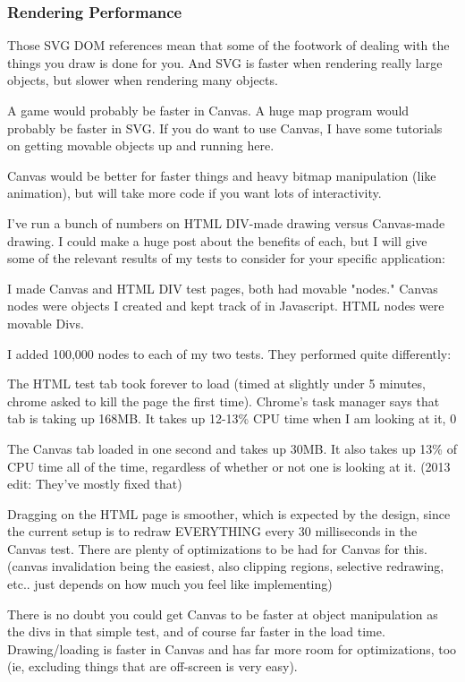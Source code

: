 \subsubsection{Rendering Performance}
Those SVG DOM references mean that some of the footwork of dealing with the things you draw is done for you. And SVG is faster when rendering really large objects, but slower when rendering many objects.

A game would probably be faster in Canvas. A huge map program would probably be faster in SVG. If you do want to use Canvas, I have some tutorials on getting movable objects up and running here.

Canvas would be better for faster things and heavy bitmap manipulation (like animation), but will take more code if you want lots of interactivity.

I've run a bunch of numbers on HTML DIV-made drawing versus Canvas-made drawing. I could make a huge post about the benefits of each, but I will give some of the relevant results of my tests to consider for your specific application:

I made Canvas and HTML DIV test pages, both had movable "nodes." Canvas nodes were objects I created and kept track of in Javascript. HTML nodes were movable Divs.

I added 100,000 nodes to each of my two tests. They performed quite differently:

The HTML test tab took forever to load (timed at slightly under 5 minutes, chrome asked to kill the page the first time). Chrome's task manager says that tab is taking up 168MB. It takes up 12-13\% CPU time when I am looking at it, 0%

The Canvas tab loaded in one second and takes up 30MB. It also takes up 13\% of CPU time all of the time, regardless of whether or not one is looking at it. (2013 edit: They've mostly fixed that)

Dragging on the HTML page is smoother, which is expected by the design, since the current setup is to redraw EVERYTHING every 30 milliseconds in the Canvas test. There are plenty of optimizations to be had for Canvas for this. (canvas invalidation being the easiest, also clipping regions, selective redrawing, etc.. just depends on how much you feel like implementing)

There is no doubt you could get Canvas to be faster at object manipulation as the divs in that simple test, and of course far faster in the load time. Drawing/loading is faster in Canvas and has far more room for optimizations, too (ie, excluding things that are off-screen is very easy).